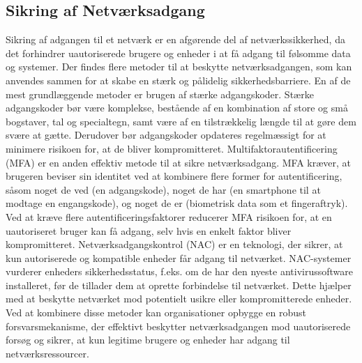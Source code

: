 \subsection{Sikring af Netværksadgang}
Sikring af adgangen til et netværk er en afgørende del af netværkssikkerhed, da det forhindrer uautoriserede brugere og enheder i at få adgang til følsomme data og systemer. Der findes flere metoder til at beskytte netværksadgangen, som kan anvendes sammen for at skabe en stærk og pålidelig sikkerhedsbarriere.
\newline\newline\noindent
En af de mest grundlæggende metoder er brugen af stærke adgangskoder. Stærke adgangskoder bør være komplekse, bestående af en kombination af store og små bogstaver, tal og specialtegn, samt være af en tilstrækkelig længde til at gøre dem svære at gætte. Derudover bør adgangskoder opdateres regelmæssigt for at minimere risikoen for, at de bliver kompromitteret.
\newline\newline\noindent
Multifaktorautentificering (MFA) er en anden effektiv metode til at sikre netværksadgang. MFA kræver, at brugeren beviser sin identitet ved at kombinere flere former for autentificering, såsom noget de ved (en adgangskode), noget de har (en smartphone til at modtage en engangskode), og noget de er (biometrisk data som et fingeraftryk). Ved at kræve flere autentificeringsfaktorer reducerer MFA risikoen for, at en uautoriseret bruger kan få adgang, selv hvis en enkelt faktor bliver kompromitteret.
\newline\newline\noindent
Netværksadgangskontrol (NAC) er en teknologi, der sikrer, at kun autoriserede og kompatible enheder får adgang til netværket. NAC-systemer vurderer enheders sikkerhedsstatus, f.eks. om de har den nyeste antivirussoftware installeret, før de tillader dem at oprette forbindelse til netværket. Dette hjælper med at beskytte netværket mod potentielt usikre eller kompromitterede enheder.
\newline\newline\noindent
Ved at kombinere disse metoder kan organisationer opbygge en robust forsvarsmekanisme, der effektivt beskytter netværksadgangen mod uautoriserede forsøg og sikrer, at kun legitime brugere og enheder har adgang til netværksressourcer.


